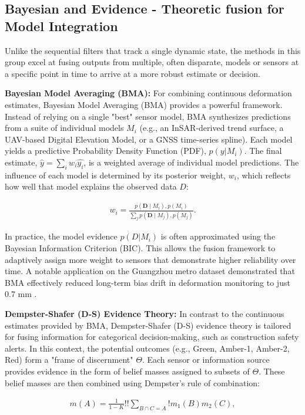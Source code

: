 \documentclass[preprint,11pt,authoryear,3p]{elsarticle}
\begin{document}
\subsection{Bayesian and Evidence - Theoretic fusion for Model Integration}

Unlike the sequential filters that track a single dynamic state, the methods in this group excel at fusing outputs from multiple, often disparate, models or sensors at a specific point in time to arrive at a more robust estimate or decision.

\textbf{Bayesian Model Averaging (BMA):} For combining continuous deformation estimates, Bayesian Model Averaging (BMA) provides a powerful framework. Instead of relying on a single "best" sensor model, BMA synthesizes predictions from a suite of individual models $M_i$ (e.g., an InSAR-derived trend surface, a UAV-based Digital Elevation Model, or a GNSS time-series spline). Each model yields a predictive Probability Density Function (PDF), $p(y|M_i)$. The final estimate, $\hat{y}=\sum_{i} w_i\hat{y_i}$, is a weighted average of individual model predictions. The influence of each model is determined by its posterior weight, $w_i$, which reflects how well that model explains the observed data $D$:

\begin{align}
w_i=\frac{p(\mathbf{D}\mid M_i),p(M_i)}{\sum_j p(\mathbf{D}\mid M_j),p(M_j)}.
\end{align}

In practice, the model evidence $p(D|M_i)$ is often approximated using the Bayesian Information Criterion (BIC). This allows the fusion framework to adaptively assign more weight to sensors that demonstrate higher reliability over time. A notable application on the Guangzhou metro dataset demonstrated that BMA effectively reduced long-term bias drift in deformation monitoring to just 0.7 mm \citep{Corradetti2022}.

\textbf{Dempster-Shafer (D-S) Evidence Theory:} In contrast to the continuous estimates provided by BMA, Dempster-Shafer (D-S) evidence theory is tailored for fusing information for categorical decision-making, such as construction safety alerts. In this context, the potential outcomes (e.g., {Green, Amber-1, Amber-2, Red}) form a "frame of discernment" $\Theta$. Each sensor or information source provides evidence in the form of belief masses assigned to subsets of $\Theta$. These belief masses are then combined using Dempster's rule of combination:

\begin{align}
m(A)=\frac{1}{1-K}!!\sum_{B\cap C=A}!m_1(B)m_2(C),
\end{align}
\end{document}
